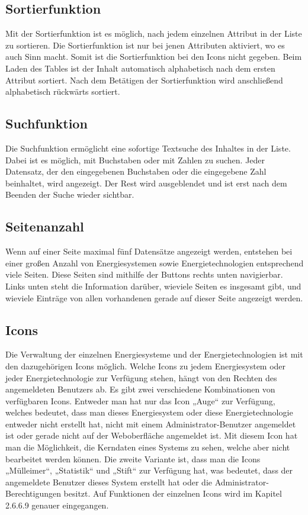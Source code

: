 \subsection{Sortierfunktion}
Mit der Sortierfunktion ist es möglich, nach jedem einzelnen Attribut in der Liste zu sortieren. Die Sortierfunktion ist nur bei jenen Attributen aktiviert, wo es auch Sinn macht. Somit ist die Sortierfunktion bei den Icons nicht gegeben. Beim Laden des Tables ist der Inhalt automatisch alphabetisch nach dem ersten Attribut sortiert. Nach dem Betätigen der Sortierfunktion wird anschließend alphabetisch rückwärts sortiert.  


\subsection{Suchfunktion}
Die Suchfunktion ermöglicht eine sofortige Textsuche des Inhaltes in der Liste. Dabei ist es möglich, mit Buchstaben oder mit Zahlen zu suchen. Jeder Datensatz, der den eingegebenen Buchstaben oder die eingegebene Zahl beinhaltet, wird angezeigt. Der Rest wird ausgeblendet und ist erst nach dem Beenden der Suche wieder sichtbar.


\subsection{Seitenanzahl}
Wenn auf einer Seite maximal fünf Datensätze angezeigt werden, entstehen bei einer großen Anzahl von Energiesystemen sowie Energietechnologien entsprechend viele Seiten. Diese Seiten sind mithilfe der Buttons rechts unten navigierbar. Links unten steht die Information darüber, wieviele Seiten es insgesamt gibt, und wieviele Einträge von allen vorhandenen gerade auf dieser Seite angezeigt werden.


\subsection{Icons}
Die Verwaltung der einzelnen Energiesysteme und der Energietechnologien ist mit den dazugehörigen Icons möglich. Welche Icons zu jedem Energiesystem oder jeder Energietechnologie zur Verfügung stehen, hängt von den Rechten des angemeldeten Benutzers ab.
Es gibt zwei verschiedene Kombinationen von verfügbaren Icons.
Entweder man hat nur das Icon „Auge“ zur Verfügung, welches bedeutet, dass man dieses Energiesystem oder diese Energietechnologie entweder nicht erstellt hat, nicht mit einem Administrator-Benutzer angemeldet ist oder gerade nicht auf der Weboberfläche angemeldet ist. Mit diesem Icon hat man die Möglichkeit, die Kerndaten eines Systems zu sehen, welche aber nicht bearbeitet werden können.
Die zweite Variante ist, dass man die Icons „Mülleimer“, „Statistik“ und „Stift“ zur Verfügung hat, was bedeutet, dass der angemeldete Benutzer dieses System erstellt hat oder die Administrator-Berechtigungen besitzt. 
Auf Funktionen der einzelnen Icons wird im Kapitel 2.6.6.9 genauer eingegangen.



